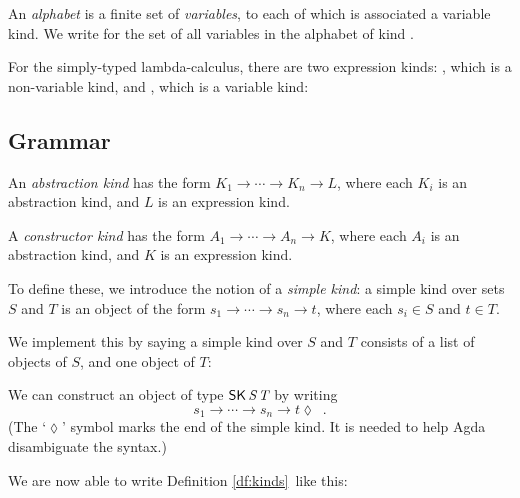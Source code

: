 \documentclass[envcountsame]{llncs}
\begin{document}

An \emph{alphabet} is a finite set of \emph{variables}, to each of which is associated a variable kind.  We write   
for the set of all variables in the alphabet  of kind .


\begin{example}
For the simply-typed lambda-calculus, there are two expression kinds: ,
which is a non-variable kind, and , which is a variable kind:

\end{example}

\subsection{Grammar}

\begin{definition}
\label{df:kinds}
An \emph{abstraction kind} has the form $K_1 \rightarrow \cdots \rightarrow K_n \rightarrow L$,
where each $K_i$ is an abstraction kind, and $L$ is an expression kind.

A \emph{constructor kind} has the form $A_1 \rightarrow \cdots \rightarrow A_n \rightarrow K$,
where each $A_i$ is an abstraction kind, and $K$ is an expression kind.
\end{definition}

To define these, we introduce the notion of a \emph{simple kind}:
a simple kind over sets $S$ and $T$ is an object of the form $s_1 \rightarrow \cdots \rightarrow s_n \rightarrow t$,
where each $s_i \in S$ and $t \in T$.

We implement this by saying a simple kind over $S$ and $T$ consists of a list of objects of $S$, and one object of $T$:


We can construct an object of type $\AgdaDatatype{SK} \, \AgdaBound{S} \, \AgdaBound{T}$ by writing 
$$ s_1 \longrightarrow \cdots \longrightarrow s_n \longrightarrow t \lozenge \enspace . $$
(The `$\lozenge$' symbol marks
the end of the simple kind.  It is needed to help Agda disambiguate the syntax.)

We are now able to write Definition \ref{df:kinds} like this:
\end{document}
